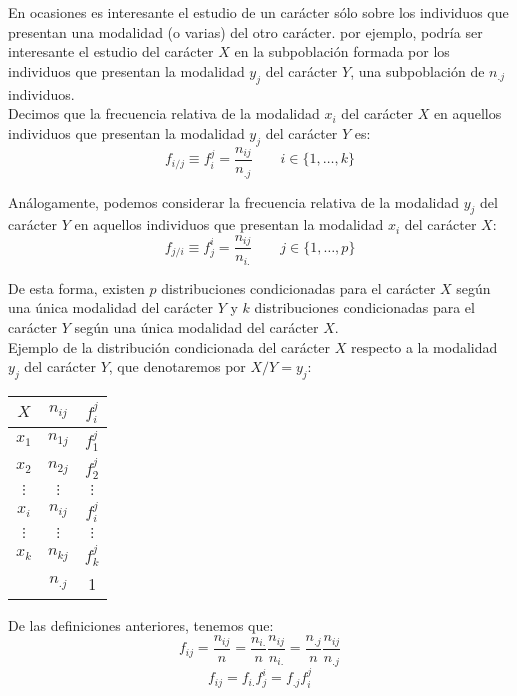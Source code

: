 En ocasiones es interesante el estudio de un carácter sólo sobre los individuos que presentan una modalidad (o varias)
del otro carácter. por ejemplo, podría ser interesante el estudio del carácter $X$ en la subpoblación formada por
los individuos que presentan la modalidad $y_j$ del carácter $Y$, una subpoblación de $n_{.j}$ individuos.\\


Decimos que la frecuencia relativa de la modalidad $x_i$ del carácter $X$ en aquellos individuos que presentan la
modalidad $y_j$ del carácter $Y$ es:
$$f_{i/j} \equiv f_i^j = \dfrac{n_{ij}}{n_{.j}} \qquad i \in \{1, \ldots, k\}$$


Análogamente, podemos considerar la frecuencia relativa de la modalidad $y_j$ del carácter $Y$ en aquellos individuos
que presentan la modalidad $x_i$ del carácter $X$:
$$f_{j/i} \equiv f_j^i = \dfrac{n_{ij}}{n_{i.}} \qquad j \in \{1, \ldots, p\}$$

De esta forma, existen $p$ distribuciones condicionadas para el carácter $X$ según una única modalidad del carácter
$Y$ y $k$ distribuciones condicionadas para el carácter $Y$ según una única modalidad del carácter $X$.\\


Ejemplo de la distribución condicionada del carácter $X$ respecto a la modalidad $y_j$ del carácter $Y$, que
denotaremos por $X/Y=y_j$:

\begin{center}
    \begin{tabular}{c|c|c}
        $X$      & $n_{ij}$ & $f_i^j$  \\
        \hline
        $x_1$    & $n_{1j}$ & $f_1^j$  \\
        \hline
        $x_2$    & $n_{2j}$ & $f_2^j$  \\
        \hline
        $\vdots$ & $\vdots$ & $\vdots$ \\
        \hline
        $x_i$    & $n_{ij}$ & $f_i^j$  \\
        \hline
        $\vdots$ & $\vdots$ & $\vdots$ \\
        \hline
        $x_k$    & $n_{kj}$ & $f_k^j$  \\
        \hline
                 & $n_{.j}$ & 1
    \end{tabular}
\end{center}

De las definiciones anteriores, tenemos que:
$$f_{ij} = \dfrac{n_{ij}}{n} = \dfrac{n_{i.}}{n}\dfrac{n_{ij}}{n_{i.}} = \dfrac{n_{.j}}{n}\dfrac{n_{ij}}{n_{.j}} $$
$$ f_{ij} = f_{i.} f_j^i = f_{.j}f_i^j $$

